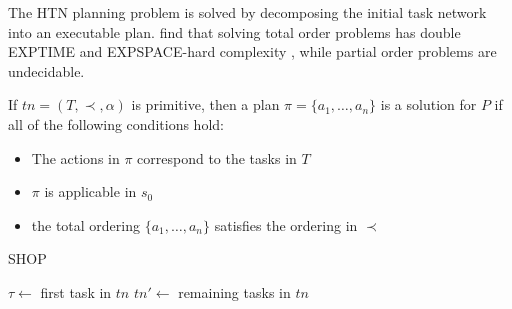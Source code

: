 
The \ac{HTN} planning problem is solved by decomposing the initial task network into an executable plan.
\cite{erolHTNPlanningComplexity1994} find that solving total order problems has double EXPTIME and EXPSPACE-hard complexity \citep{papadimitriouComputationalComplexity2003}, while partial order problems are undecidable.

\begin{definition}
  If $tn = (T,\prec,\alpha)$ is primitive, then a plan $\pi = \{a_1,\dots,a_n\}$ is a solution for $P$ if all of the following conditions hold:
  \begin{itemize}
    \item The actions in $\pi$ correspond to the tasks in $T$
    \item $\pi$ is applicable in $s_0$
    \item the total ordering $\{a_1,\dots,a_n\}$ satisfies the ordering in $\prec$
  \end{itemize}
  \label{def:htn-sol}
\end{definition}

\begin{algorithm}[t]
  \caption{SHOP}
  \label{alg:background:shop}
  \KwOut{$\pi$}
  $\tau \leftarrow$ first task in $tn$\;
  $tn' \leftarrow$ remaining tasks in $tn$\;
\end{algorithm}

